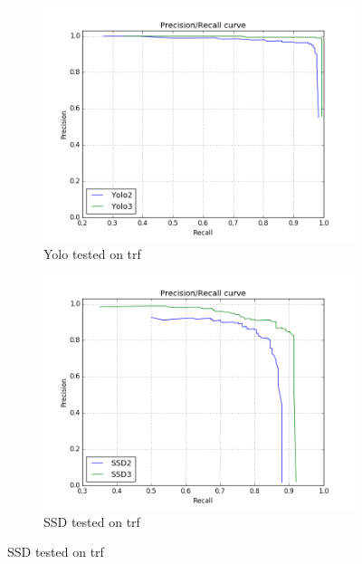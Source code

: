 \begin{figure}[h!]
\begin{subfigure}{.5\textwidth}
  \centering
  \includegraphics[width=0.8\linewidth]{results/case_buildings/prec_recall/yolo/trf.png}
  \caption{Yolo tested on trf}
  \label{fig:sfig1}
\end{subfigure}%
\begin{subfigure}{.5\textwidth}
  \centering
  \includegraphics[width=.8\linewidth]{results/case_buildings/prec_recall/ssd/trf.png}
  \caption{SSD tested on trf}
  \label{fig:sfig2}
\end{subfigure}


\end{figure}
